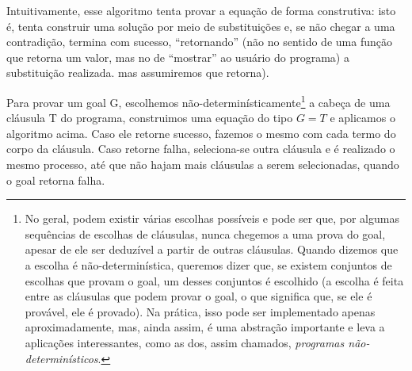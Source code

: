 \documentclass{article}
\theoremstyle{remark}
\theoremstyle{theorem}
\begin{document}

Intuitivamente, esse algoritmo tenta provar a equação de forma construtiva: isto é, tenta construir uma solução por meio de substituições e, se não chegar a uma contradição, termina com sucesso, ``retornando'' (não no sentido de uma função que retorna um valor, mas no de ``mostrar'' ao usuário do programa) a substituição realizada.
mas assumiremos que retorna).

Para provar um goal G, escolhemos não-determinísticamente\footnote{No geral, podem existir várias escolhas possíveis e pode ser que, por algumas sequências de escolhas de cláusulas, nunca chegemos a uma prova do goal, apesar de ele ser deduzível a partir de outras cláusulas. Quando dizemos que a escolha é não-determinística, queremos dizer que, se existem conjuntos de escolhas que provam o goal, um desses conjuntos é escolhido (a escolha é feita entre as cláusulas que podem provar o
  goal, o que significa que, se ele é provável, ele é provado). Na prática, isso pode ser implementado apenas aproximadamente, mas, ainda assim, é uma abstração importante e leva a aplicações interessantes, como as dos, assim chamados, \textit{programas não-determinísticos}.} a cabeça de uma cláusula T do programa, construimos uma equação do tipo $G = T$ e aplicamos o algoritmo acima. Caso ele retorne sucesso, fazemos o mesmo com cada termo do corpo da cláusula. Caso retorne falha, seleciona-se outra cláusula e é realizado o mesmo processo, até que não hajam mais cláusulas a serem selecionadas, quando o goal retorna falha.
\end{document}
